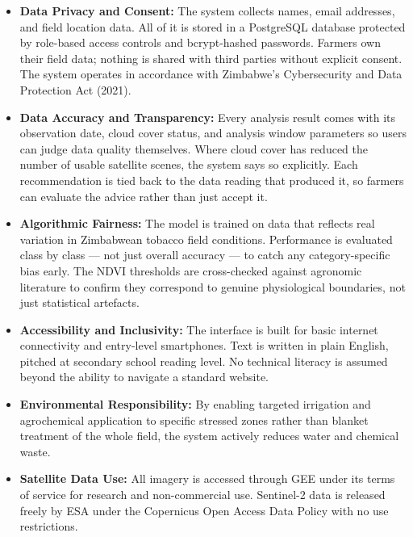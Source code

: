\documentclass[12pt,a4paper]{report}
\begin{document}
\begin{itemize}
  \item \textbf{Data Privacy and Consent:} The system collects names, email addresses, and field location data. All of it is stored in a PostgreSQL database protected by role-based access controls and bcrypt-hashed passwords. Farmers own their field data; nothing is shared with third parties without explicit consent. The system operates in accordance with Zimbabwe's Cybersecurity and Data Protection Act (2021).

  \item \textbf{Data Accuracy and Transparency:} Every analysis result comes with its observation date, cloud cover status, and analysis window parameters so users can judge data quality themselves. Where cloud cover has reduced the number of usable satellite scenes, the system says so explicitly. Each recommendation is tied back to the data reading that produced it, so farmers can evaluate the advice rather than just accept it.

  \item \textbf{Algorithmic Fairness:} The model is trained on data that reflects real variation in Zimbabwean tobacco field conditions. Performance is evaluated class by class — not just overall accuracy — to catch any category-specific bias early. The NDVI thresholds are cross-checked against agronomic literature to confirm they correspond to genuine physiological boundaries, not just statistical artefacts.

  \item \textbf{Accessibility and Inclusivity:} The interface is built for basic internet connectivity and entry-level smartphones. Text is written in plain English, pitched at secondary school reading level. No technical literacy is assumed beyond the ability to navigate a standard website.

  \item \textbf{Environmental Responsibility:} By enabling targeted irrigation and agrochemical application to specific stressed zones rather than blanket treatment of the whole field, the system actively reduces water and chemical waste.

  \item \textbf{Satellite Data Use:} All imagery is accessed through GEE under its terms of service for research and non-commercial use. Sentinel-2 data is released freely by ESA under the Copernicus Open Access Data Policy with no use restrictions.
\end{itemize}
\end{document}
